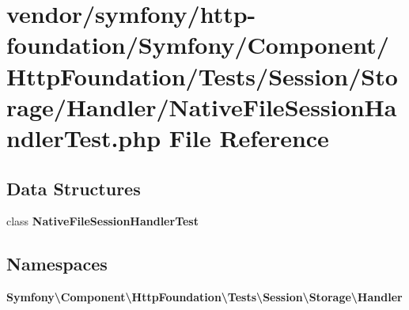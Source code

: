 \section{vendor/symfony/http-\/foundation/\+Symfony/\+Component/\+Http\+Foundation/\+Tests/\+Session/\+Storage/\+Handler/\+Native\+File\+Session\+Handler\+Test.php File Reference}
\label{_native_file_session_handler_test_8php}
\subsection*{Data Structures}
\begin{DoxyCompactItemize}
\item 
class {\bf Native\+File\+Session\+Handler\+Test}
\end{DoxyCompactItemize}
\subsection*{Namespaces}
\begin{DoxyCompactItemize}
\item 
 {\bf Symfony\textbackslash{}\+Component\textbackslash{}\+Http\+Foundation\textbackslash{}\+Tests\textbackslash{}\+Session\textbackslash{}\+Storage\textbackslash{}\+Handler}
\end{DoxyCompactItemize}
